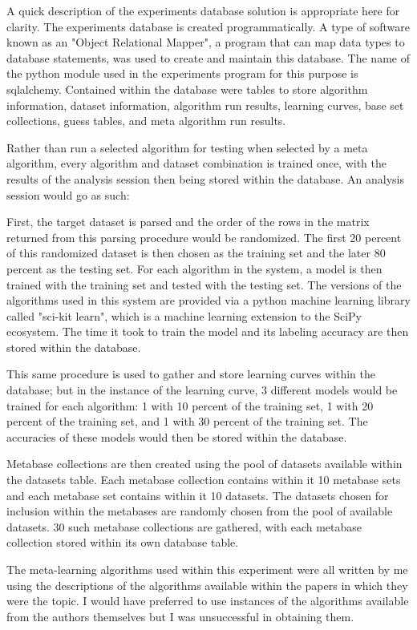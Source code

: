 A quick description of the experiments database solution is appropriate here for
clarity. The experiments database is created programmatically. A type of software
known as an "Object Relational Mapper", a program that can map data types to
database statements, was used to create and maintain this database. The name of
the python module used in the experiments program for this purpose is sqlalchemy.
Contained within the database were tables to store algorithm information,
dataset information, algorithm run results, learning curves, base set
collections, guess tables, and meta algorithm run results.

Rather than run a selected algorithm for testing when selected by a meta
algorithm, every algorithm and dataset combination is trained once, with the
results of the analysis session then being stored within the database. An
analysis session would go as such:

First, the target dataset is parsed and the order of the rows in the matrix
returned from this parsing procedure would be randomized. The first 20 percent
of this randomized dataset is then chosen as the training set and the later
80 percent as the testing set. For each algorithm in the system, a model is then
trained with the training set and tested with the testing set. The versions
of the algorithms used in this system are provided via a python machine learning
library called "sci-kit learn", which is a machine learning extension to the
SciPy ecosystem. The time it took to train the model and its labeling accuracy
are then stored within the database.

This same procedure is used to gather and store learning curves within the
database; but in the instance of the learning curve, 3 different models would
be trained for each algorithm: 1 with 10 percent of the training set, 1 with 20
percent of the training set, and 1 with 30 percent of the training set. The
accuracies of these models would then be stored within the database.

Metabase collections are then created using the pool of datasets available
within the datasets table. Each metabase collection contains within it 10
metabase sets and each metabase set contains within it 10 datasets. The datasets
chosen for inclusion within the metabases are randomly chosen from the pool of
available datasets. 30 such metabase collections are gathered, with each
metabase collection stored within its own database table.

The meta-learning algorithms used within this experiment were all written by me
using the descriptions of the algorithms available within the papers in which
they were the topic. I would have preferred to use instances of the algorithms
available from the authors themselves but I was unsuccessful in obtaining them.

